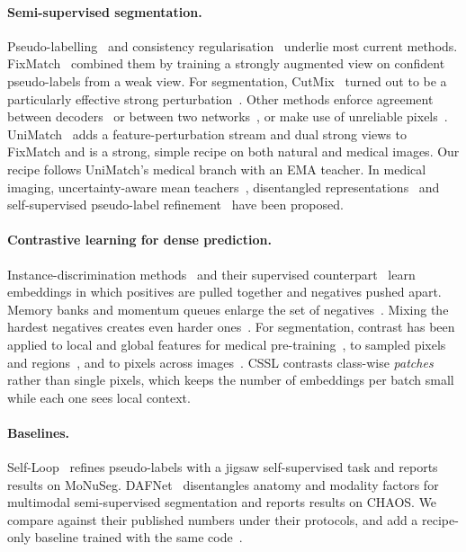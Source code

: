 \documentclass[11pt]{article}
\begin{document}
\paragraph{Semi-supervised segmentation.}
Pseudo-labelling~\citep{lee2013pseudo} and consistency regularisation~\citep{laine2017temporal,tarvainen2017mean} underlie most current methods. FixMatch~\citep{sohn2020fixmatch} combined them by training a strongly augmented view on confident pseudo-labels from a weak view. For segmentation, CutMix~\citep{yun2019cutmix} turned out to be a particularly effective strong perturbation~\citep{french2020strong}. Other methods enforce agreement between decoders~\citep{ouali2020cct} or between two networks~\citep{chen2021cps}, or make use of unreliable pixels~\citep{wang2022u2pl}. UniMatch~\citep{yang2023unimatch} adds a feature-perturbation stream and dual strong views to FixMatch and is a strong, simple recipe on both natural and medical images. Our recipe follows UniMatch's medical branch with an EMA teacher. In medical imaging, uncertainty-aware mean teachers~\citep{yu2019uamt}, disentangled representations~\citep{chartsias2019sdnet,chartsias2021dafnet} and self-supervised pseudo-label refinement~\citep{li2020selfloop} have been proposed.

\paragraph{Contrastive learning for dense prediction.}
Instance-discrimination methods~\citep{wu2018instance,he2020moco,chen2020simclr} and their supervised counterpart~\citep{khosla2020supcon} learn embeddings in which positives are pulled together and negatives pushed apart. Memory banks and momentum queues enlarge the set of negatives~\citep{wu2018instance,he2020moco}. Mixing the hardest negatives creates even harder ones~\citep{kalantidis2020mochi}. For segmentation, contrast has been applied to local and global features for medical pre-training~\citep{chaitanya2020contrastive}, to sampled pixels and regions~\citep{liu2022reco}, and to pixels across images~\citep{wang2021pixelcontrast}. CSSL contrasts class-wise \emph{patches} rather than single pixels, which keeps the number of embeddings per batch small while each one sees local context.

\paragraph{Baselines.}
Self-Loop~\citep{li2020selfloop} refines pseudo-labels with a jigsaw self-supervised task and reports results on MoNuSeg. DAFNet~\citep{chartsias2021dafnet} disentangles anatomy and modality factors for multimodal semi-supervised segmentation and reports results on CHAOS. We compare against their published numbers under their protocols, and add a recipe-only baseline trained with the same code~\citep{oliver2018realistic}.
\end{document}
